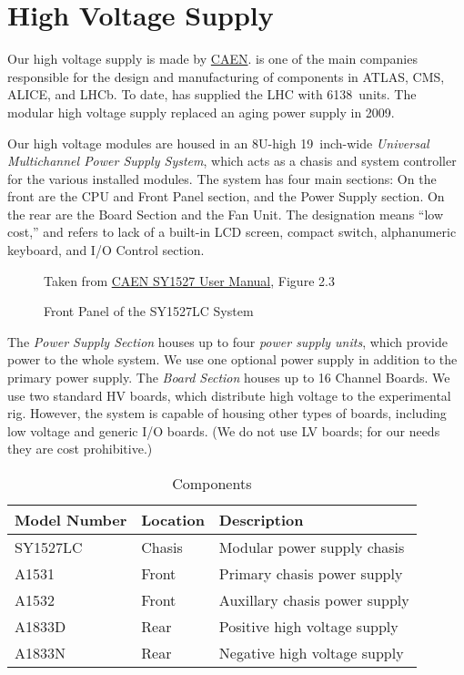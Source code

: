 
\chapter{High Voltage Supply}
\label{chap:eq_high_voltage}

Our high voltage supply is made by \href{http://www.caen.it/}{CAEN}.   is one of the main companies responsible for the design and manufacturing of components in ATLAS, CMS, ALICE, and LHCb.  To date,  has supplied the LHC with 6138~units.  The modular  high voltage supply replaced an aging power supply in 2009.  %

Our high voltage modules are housed in an 8U-high 19~inch-wide  \textit{Universal Multichannel Power Supply System}, which acts as a chasis and system controller for the various installed modules.  The  system has four main sections:  On the front are the CPU and Front Panel section, and the Power Supply section.  On the rear are the Board Section and the Fan Unit.  The  designation means ``low cost,'' and refers to lack of a built-in LCD screen, compact switch, alphanumeric keyboard, and I/O Control section.  

\begin{figure}[htbp]
  \centering
  {
    \tiny Taken from \href{Manuals/CAEN sy1527usermanual_rev15}{CAEN SY1527 User Manual}, Figure 2.3
  }
  \caption{Front Panel of the SY1527LC System}
  \label{fig:eq_high_voltage:chasis_front}
\end{figure}

The \textit{Power Supply Section} houses up to four \textit{power supply units}, which provide power to the whole system.  We use one optional power supply in addition to the primary power supply.  The \textit{Board Section} houses up to 16 Channel Boards.  We use two standard HV boards, which distribute high voltage to the experimental rig.  However, the system is capable of housing other types of boards, including low voltage and generic I/O boards.  (We do not use  LV boards; for our needs they are cost prohibitive.)

\begin{table}[htbp]\begin{center}
    \begin{tabular}{>{\ttfamily}l l l}
      \toprule
      \normalfont Model Number & Location & Description \\
      \midrule
      SY1527LC & Chasis & Modular power supply chasis \\
      A1531 & Front & Primary chasis power supply \\
      A1532 & Front & Auxillary chasis power supply \\
      A1833D & Rear & Positive high voltage supply \\
      A1833N & Rear & Negative high voltage supply \\
      \bottomrule
    \end{tabular}
    \caption{ Components}
    \label{tab:eq_high_voltage:parts}
\end{center}\end{table}


